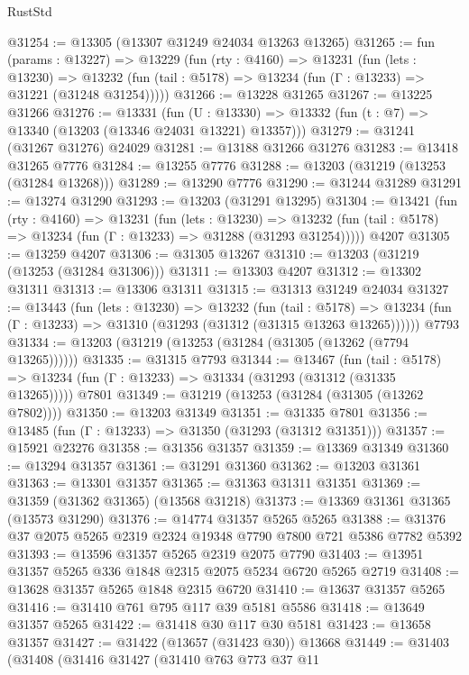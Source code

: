 \begin{lexlean}{RustStd}
\begin{coremodule}
@31254 := @13305 (@13307 @31249 @24034 @13263 @13265)
@31265 := fun (params : @13227) =>
  @13229
    (fun (rty : @4160) =>
    @13231
      (fun (lets : @13230) =>
      @13232 (fun (tail : @5178) => @13234 (fun (Γ : @13233) => @31221 (@31248 @31254)))))
@31266 := @13228 @31265
@31267 := @13225 @31266
@31276 := @13331
    (fun (U : @13330) => @13332 (fun (t : @7) => @13340 (@13203 (@13346 @24031 @13221) @13357)))
@31279 := @31241 (@31267 @31276) @24029
@31281 := @13188 @31266 @31276
@31283 := @13418 @31265 @7776
@31284 := @13255 @7776
@31288 := @13203 (@31219 (@13253 (@31284 @13268)))
@31289 := @13290 @7776
@31290 := @31244 @31289
@31291 := @13274 @31290
@31293 := @13203 (@31291 @13295)
@31304 := @13421
    (fun (rty : @4160) =>
    @13231
      (fun (lets : @13230) =>
      @13232 (fun (tail : @5178) => @13234 (fun (Γ : @13233) => @31288 (@31293 @31254)))))
    @4207
@31305 := @13259 @4207
@31306 := @31305 @13267
@31310 := @13203 (@31219 (@13253 (@31284 @31306)))
@31311 := @13303 @4207
@31312 := @13302 @31311
@31313 := @13306 @31311
@31315 := @31313 @31249 @24034
@31327 := @13443
    (fun (lets : @13230) =>
    @13232
      (fun (tail : @5178) =>
      @13234 (fun (Γ : @13233) => @31310 (@31293 (@31312 (@31315 @13263 @13265))))))
    @7793
@31334 := @13203 (@31219 (@13253 (@31284 (@31305 (@13262 (@7794 @13265))))))
@31335 := @31315 @7793
@31344 := @13467
    (fun (tail : @5178) => @13234 (fun (Γ : @13233) => @31334 (@31293 (@31312 (@31335 @13265)))))
    @7801
@31349 := @31219 (@13253 (@31284 (@31305 (@13262 @7802))))
@31350 := @13203 @31349
@31351 := @31335 @7801
@31356 := @13485 (fun (Γ : @13233) => @31350 (@31293 (@31312 @31351)))
@31357 := @15921 @23276
@31358 := @31356 @31357
@31359 := @13369 @31349
@31360 := @13294 @31357
@31361 := @31291 @31360
@31362 := @13203 @31361
@31363 := @13301 @31357
@31365 := @31363 @31311 @31351
@31369 := @31359 (@31362 @31365) (@13568 @31218)
@31373 := @13369 @31361 @31365 (@13573 @31290)
@31376 := @14774 @31357 @5265 @5265
@31388 := @31376 @37 @2075 @5265 @2319 @2324 @19348 @7790 @7800 @721 @5386 @7782 @5392
@31393 := @13596 @31357 @5265 @2319 @2075 @7790
@31403 := @13951 @31357 @5265 @336 @1848 @2315 @2075 @5234 @6720 @5265 @2719
@31408 := @13628 @31357 @5265 @1848 @2315 @6720
@31410 := @13637 @31357 @5265
@31416 := @31410 @761 @795 @117 @39 @5181 @5586
@31418 := @13649 @31357 @5265
@31422 := @31418 @30 @117 @30 @5181
@31423 := @13658 @31357
@31427 := @31422 (@13657 (@31423 @30)) @13668
@31449 := @31403
    (@31408
      (@31416
        @31427
        (@31410
          @763
          @773
          @37
          @11

\end{coremodule}
\end{lexlean}
